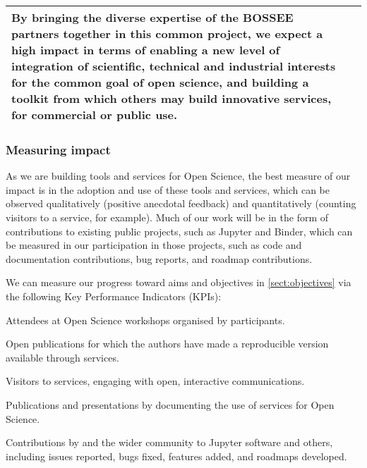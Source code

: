 \begin{center}
\begin{tabular}{|m{}|m{}|}
  By bringing the diverse expertise of the BOSSEE partners together in this
  common project, we expect a high impact in terms of enabling a new level of
  integration of scientific, technical and industrial interests for the common
  goal of open science,
  and building a toolkit from which others may build innovative services,
  for commercial or public use.

  \\\hline

\end{tabular}
\end{center}


\subsubsection{Measuring impact}

As we are building tools and services for Open Science,
the best measure of our impact is in the adoption and use of these tools and services,
which can be observed qualitatively (positive anecdotal feedback) and quantitatively
(counting visitors to a service, for example).
Much of our work will be in the form of contributions to existing public projects,
such as Jupyter and Binder,
which can be measured in our participation in those projects,
such as code and documentation contributions,
bug reports, and roadmap contributions.

We can measure our progress toward aims and objectives in \ref{sect:objectives}
via the following
Key Performance Indicators (KPIs):

\begin{compactenum}
  \item \label{kpi:workshop-attendees}
    Attendees at Open Science workshops organised by \TheProject participants.
  \item \label{kpi:binder-publications}
    Open publications for which the authors have made a reproducible version available 
    through \TheProject services.
  \item \label{kpi:binder-visits}
    Visitors to \TheProject services, engaging with open, interactive communications.
  \item \label{kpi:dissemination}
    Publications and presentations by \TheProject documenting the use of \TheProject services for 
    Open Science.
  \item \label{kpi:contributions}
    Contributions by \TheProject and the wider community to Jupyter software and others,
    including issues reported, bugs fixed,
    features added, and roadmaps developed.
\end{compactenum}

